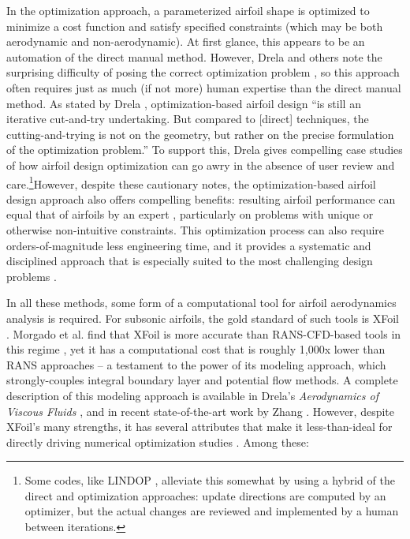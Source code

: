 \documentclass[journal]{new-aiaa}
\begin{document}
In the optimization approach, a parameterized airfoil shape is optimized to minimize a cost function and satisfy specified constraints (which may be both aerodynamic and non-aerodynamic). At first glance, this appears to be an automation of the direct manual method. However, Drela and others note the surprising difficulty of posing the correct optimization problem \cite{drelaProsConsAirfoil1998,krooMultidisciplinaryOptimizationApplications1997}, so this approach often requires just as much (if not more) human expertise than the direct manual method. As stated by Drela \cite{drelaProsConsAirfoil1998}, optimization-based airfoil design ``is still an iterative cut-and-try undertaking. But compared to [direct] techniques, the cutting-and-trying is not on the geometry, but rather on the precise formulation of the optimization problem.'' To support this, Drela gives compelling case studies of how airfoil design optimization can go awry in the absence of user review and care.\footnote{Some codes, like LINDOP \cite{mses}, alleviate this somewhat by using a hybrid of the direct and optimization approaches: update directions are computed by an optimizer, but the actual changes are reviewed and implemented by a human between iterations.}However, despite these cautionary notes, the optimization-based airfoil design approach also offers compelling benefits: resulting airfoil performance can equal that of airfoils by an expert \cite{drelaProsConsAirfoil1998}, particularly on problems with unique or otherwise non-intuitive constraints. This optimization process can also require orders-of-magnitude less engineering time, and it provides a systematic and disciplined approach that is especially suited to the most challenging design problems \cite{he2019robust}.

In all these methods, some form of a computational tool for airfoil aerodynamics analysis is required. For subsonic airfoils, the gold standard of such tools is XFoil \cite{drelaXFOILAnalysisDesign1989}. Morgado et al. find that XFoil is more accurate than RANS-CFD-based tools in this regime \cite{morgado2016xfoil}, yet it has a computational cost that is roughly 1,000x lower than RANS approaches -- a testament to the power of its modeling approach, which strongly-couples integral boundary layer and potential flow methods. A complete description of this modeling approach is available in Drela's \textit{Aerodynamics of Viscous Fluids} \cite{drelaAerodynamicsViscousFluids2019}, and in recent state-of-the-art work by Zhang \cite{zhangThreedimensionalIntegralBoundary2022,zhangNonparametricDiscontinuousGalerkin2017}. However, despite XFoil's many strengths, it has several attributes that make it less-than-ideal for directly driving numerical optimization studies \cite{adlerCFDNotCFD2022}. Among these:
\end{document}
